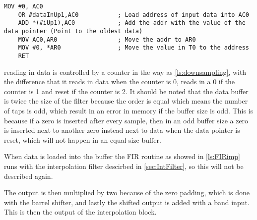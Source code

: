 \begin{lstlisting}[language={[x86masm]Assembler}, caption = {Zero padding.},label={ls:zero}]
	MOV #0, AC0
	OR #dataInUp1,AC0			; Load address of input data into AC0
	ADD *(#iUp1),AC0			; Add the addr with the value of the data pointer (Point to the oldest data)
	MOV AC0,AR0					; Move the addr to AR0
	MOV #0, *AR0				; Move the value in T0 to the address
	RET
\end{lstlisting}
reading in data is controlled by a counter in the way as \autoref{ls:downsampling}, with the difference that it reads in data when the counter is 0, reads in a 0 if the counter is 1 and reset if the counter is 2. It should be noted that the data buffer is twice the size of the filter because the order is equal which means the number of taps is odd, which result in an error in memory if the buffer size is odd. This is because if a zero is inserted after every sample, then in an odd buffer size a zero is inserted next to another zero instead next to data when the data pointer is reset, which will not happen in an equal size buffer. 

When data is loaded into the buffer the FIR routine as showed in \autoref{ls:FIRimp} runs with the interpolation filter descirbed in \autoref{sec:IntFilter}, so this will not be described again. 

The output is then multiplied by two because of the zero padding, which is done with the barrel shifter, and lastly the shifted output is added with a band input. This is then the output of the interpolation block.



